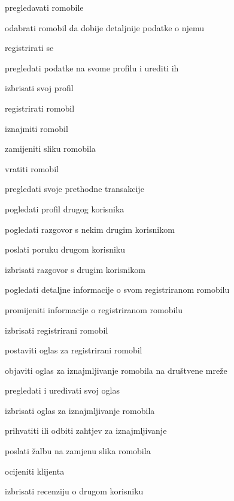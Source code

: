 			
			\begin{packed_enum}
				\item  {}
				
				\begin{packed_enum}
					
					\item pregledavati romobile
					\item odabrati romobil da dobije detaljnije podatke o njemu
					\item registrirati se
					
					
				\end{packed_enum}
			
				\item  {}
				
				\begin{packed_enum}
					\item pregledati podatke na svome profilu i urediti ih 
					\item izbrisati svoj profil
					\item registrirati romobil
					\item iznajmiti romobil
					\item zamijeniti sliku romobila
					\item vratiti romobil
					\item pregledati svoje prethodne transakcije
					\item pogledati profil drugog korisnika
					\item pogledati razgovor s nekim drugim korisnikom
					\item poslati poruku drugom korisniku
					\item izbrisati razgovor s drugim korisnikom
					
				
					
				\end{packed_enum}
				\item  {}
				
				\begin{packed_enum}
				\item pogledati detaljne informacije o svom registriranom romobilu
				\item promijeniti informacije o registriranom romobilu
				\item izbrisati registrirani romobil
				\item postaviti oglas za registrirani romobil
				\item objaviti oglas za iznajmljivanje romobila na društvene mreže
				\item pregledati i uređivati svoj oglas
				\item izbrisati oglas za iznajmljivanje romobila
				\item prihvatiti ili odbiti zahtjev za iznajmljivanje
				\item poslati žalbu na zamjenu slika romobila 
				\item ocijeniti klijenta
				\item izbrisati recenziju o drugom korisniku
				

\end{packed_enum}
\end{packed_enum}
